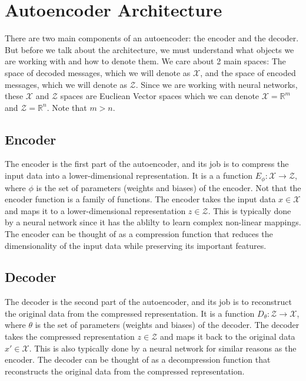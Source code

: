 \documentclass[answers,12pt,addpoints]{exam}
\begin{document}
\section{Autoencoder Architecture}
There are two main components of an autoencoder: the encoder and the decoder. But before we talk about the architecture, we must understand what objects we are working with and how to denote them. We care about 2 main spaces: The space of decoded messages, which we will denote as $\mathcal{X}$, and the space of encoded messages, which we will denote as $\mathcal{Z}$. Since we are working with neural networks, these $\mathcal{X}$ and $\mathcal{Z}$ spaces are Eucliean Vector spaces which we can denote $\mathcal{X} = \mathbb{R}^m$ and $\mathcal{Z} = \mathbb{R}^n$. Note that $m > n$.
\subsection{Encoder}
The encoder is the first part of the autoencoder, and its job is to compress the input data into a lower-dimensional representation. It is a a function $E_\phi : \mathcal{X} \to \mathcal{Z}$, where $\phi$ is the set of parameters (weights and biases) of the encoder. Not that the encoder function is a family of functions. The encoder takes the input data $x \in \mathcal{X}$ and maps it to a lower-dimensional representation $z \in \mathcal{Z}$. This is typically done by a neural network since it has the ablilty to learn complex non-linear mappings. The encoder can be thought of as a compression function that reduces the dimensionality of the input data while preserving its important features.
\subsection{Decoder}
The decoder is the second part of the autoencoder, and its job is to reconstruct the original data from the compressed representation. It is a function $D_\theta : \mathcal{Z} \to \mathcal{X}$, where $\theta$ is the set of parameters (weights and biases) of the decoder. The decoder takes the compressed representation $z \in \mathcal{Z}$ and maps it back to the original data $x' \in \mathcal{X}$. This is also typically done by a neural network for similar reasons as the encoder. The decoder can be thought of as a decompression function that reconstructs the original data from the compressed representation. 
\end{document}
